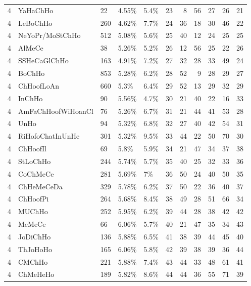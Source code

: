 \begin{longtable}{lllllrrrrrr}
  4 & YaHaChHo & 22 & 4.55\% & 5.4\% &  23 &   8 &  56 &  27 &  26 &  21 \\ 
  4 & LeBoChHo & 260 & 4.62\% & 7.7\% &  24 &  36 &  18 &  30 &  46 &  22 \\ 
  4 & NeYoPr/MoStChHo & 512 & 5.08\% & 5.6\% &  25 &  40 &  12 &  24 &  25 &  25 \\ 
  4 & AlMeCe & 38 & 5.26\% & 5.2\% &  26 &  12 &  56 &  25 &  22 &  26 \\ 
  4 & SSHeCaGlChHo & 163 & 4.91\% & 7.2\% &  27 &  32 &  28 &  33 &  49 &  24 \\ 
  4 & BoChHo & 853 & 5.28\% & 6.2\% &  28 &  52 &   9 &  28 &  29 &  27 \\ 
  4 & ChHoofLoAn & 660 & 5.3\% & 6.4\% &  29 &  52 &  13 &  29 &  32 &  29 \\ 
  4 & InChHo & 90 & 5.56\% & 4.7\% &  30 &  21 &  40 &  22 &  16 &  33 \\ 
  4 & AmFaChHoofWiHoanCl & 76 & 5.26\% & 6.7\% &  31 &  21 &  44 &  41 &  53 &  28 \\ 
  4 & UnHo & 94 & 5.32\% & 6.8\% &  32 &  27 &  40 &  42 &  54 &  31 \\ 
  4 & RiHofoChatInUnHe & 301 & 5.32\% & 9.5\% &  33 &  44 &  22 &  50 &  70 &  30 \\ 
  4 & ChHoofIl & 69 & 5.8\% & 5.9\% &  34 &  21 &  47 &  34 &  37 &  38 \\ 
  4 & StLoChHo & 244 & 5.74\% & 5.7\% &  35 &  40 &  25 &  32 &  33 &  36 \\ 
  4 & CoChMeCe & 281 & 5.69\% & 7\% &  36 &  50 &  24 &  40 &  50 &  35 \\ 
  4 & ChHeMeCeDa & 329 & 5.78\% & 6.2\% &  37 &  50 &  22 &  36 &  40 &  37 \\ 
  4 & ChHoofPi & 264 & 5.68\% & 8.4\% &  38 &  49 &  28 &  51 &  66 &  34 \\ 
  4 & MUChHo & 252 & 5.95\% & 6.2\% &  39 &  44 &  28 &  38 &  42 &  42 \\ 
  4 & MeMeCe & 66 & 6.06\% & 5.7\% &  40 &  21 &  47 &  35 &  34 &  43 \\ 
  4 & JoDiChHo & 136 & 5.88\% & 6.5\% &  41 &  38 &  39 &  44 &  45 &  40 \\ 
  4 & ThJoHoHo & 165 & 6.06\% & 5.8\% &  42 &  39 &  38 &  39 &  36 &  44 \\ 
  4 & CMChHo & 221 & 5.88\% & 7.4\% &  43 &  44 &  33 &  48 &  61 &  41 \\ 
  4 & ChMeHeHo & 189 & 5.82\% & 8.6\% &  44 &  44 &  36 &  55 &  71 &  39 \\ 

\end{longtable}
